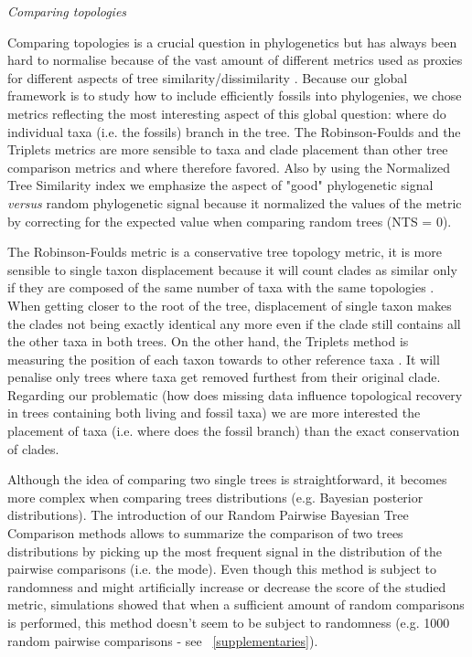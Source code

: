 \documentclass[12pt,letterpaper]{article}
\renewcommand{\subsection}[1]{%
\bigskip
\begin{center}
\begin{large}
\normalfont\itshape #1
\end{large}
\end{center}}
\begin{document}
\subsection{Comparing topologies} %
Comparing topologies is a crucial question in phylogenetics but has always been hard to normalise because of the vast amount of different metrics used as proxies for different aspects of tree similarity/dissimilarity \citep{agapowpower2002}.
Because our global framework is to study how to include efficiently fossils into phylogenies, we chose metrics reflecting the most interesting aspect of this global question: where do individual taxa (i.e. the fossils) branch in the tree.
The Robinson-Foulds \citep{RF1981} and the Triplets \citep{critchlowthe1996} metrics are more sensible to taxa and clade placement than other tree comparison metrics \citep[e.g.][Imbalance metric]{kirkpatricksearching1993} and where therefore favored.
Also by using the Normalized Tree Similarity index \citep{Bogdanowicz2012} we emphasize the aspect of "good" phylogenetic signal \textit{versus} random phylogenetic signal because it normalized the values of the metric by correcting for the expected value when comparing random trees (NTS = 0).

The Robinson-Foulds metric is a conservative tree topology metric, it is more sensible to single taxon displacement because it will count clades as similar only if they are composed of the same number of taxa with the same topologies \citep{RF1981}.
When getting closer to the root of the tree, displacement of single taxon makes the clades not being exactly identical any more even if the clade still contains all the other taxa in both trees.
On the other hand, the Triplets method is measuring the position of each taxon towards to other reference taxa \citep{critchlowthe1996}.
It will penalise only trees where taxa get removed furthest from their original clade.
Regarding our problematic (how does missing data influence topological recovery in trees containing both living and fossil taxa) we are more interested the placement of taxa (i.e. where does the fossil branch) than the exact conservation of clades.


Although the idea of comparing two single trees is straightforward, it becomes more complex when comparing trees distributions (e.g. Bayesian posterior distributions).
The introduction of our Random Pairwise Bayesian Tree Comparison methods allows to summarize the comparison of two trees distributions by picking up the most frequent signal in the distribution of the pairwise comparisons (i.e. the mode).
Even though this method is subject to randomness and might artificially increase or decrease the score of the studied metric, simulations showed that when a sufficient amount of random comparisons is performed, this method doesn't seem to be subject to randomness (e.g. 1000 random pairwise comparisons - see ~\ref{supplementaries}).
\end{document}
